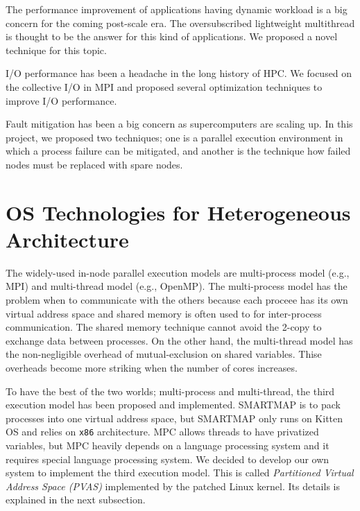 The performance improvement of applications having dynamic
workload is a big concern for the coming post-scale era. The
oversubscribed lightweight multithread is thought to be the answer for
this kind of applications. We proposed a novel technique for this
topic. 

I/O performance has been a headache in the long history of HPC. We
focused on the collective I/O in MPI and proposed several optimization
techniques to improve I/O performance.

Fault mitigation has been a big concern as supercomputers are scaling
up. In this project, we proposed two techniques; one is a parallel
execution environment in which a process failure can be mitigated, and
another is the technique how failed nodes must be replaced with spare
nodes. 

\section{OS Technologies for Heterogeneous Architecture}

The widely-used in-node parallel execution models are
multi-process model (e.g., MPI) and multi-thread model (e.g.,
OpenMP). The multi-process model has the problem when to communicate
with the others because each proceee has its own virtual address space
and shared memory is often used to for inter-process
communication. The shared memory technique cannot avoid the 2-copy to
exchange data between processes. On the other hand, the multi-thread
model has the non-negligible overhead of mutual-exclusion on shared
variables. Thise overheads become more striking when the number of
cores increases.  

To have the best of the two worlds; multi-process and multi-thread,
the third execution model has been proposed and implemented. SMARTMAP
is to pack processes into one virtual address space, but SMARTMAP only
runs on Kitten OS and relies on {\tt x86}
architecture\cite{Brightwell:2008:SOS:1413370.1413396}. MPC  
allows threads to have privatized variables, but MPC heavily depends
on a language processing system and it requires special language
processing system\cite{pjn2008}. We
decided to develop our own system to implement the third execution
model. This is called {\em Partitioned Virtual Address Space (PVAS)}
implemented by the patched Linux kernel. Its details is explained in
the next subsection. 

